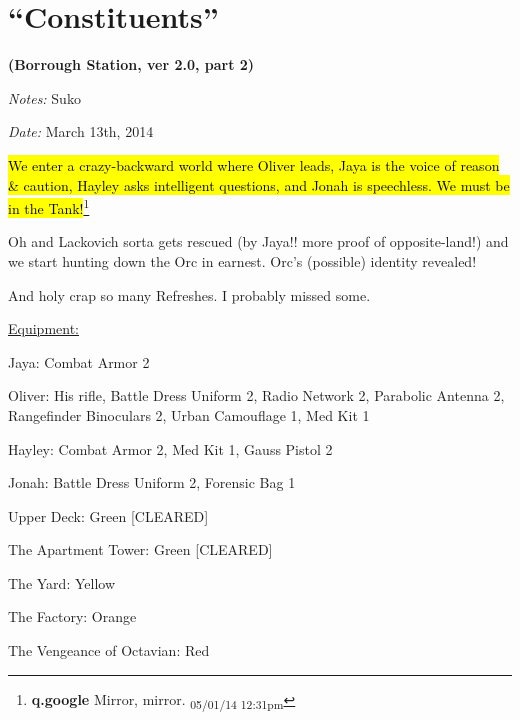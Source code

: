 \setcounter{chapter}{ 21 }
\chapter{\textbf{``Constituents''} }




\begin{center}
 {\LARGE \textbf{(Borrough Station, ver 2.0, part 2)} } 
\end{center}




\textit{Notes:} Suko

\textit{Date:} March 13th, 2014



\hl{We enter a crazy-backward world where Oliver leads, Jaya is the voice of reason \& caution, Hayley asks intelligent questions, and Jonah is speechless.  We must be in the Tank!}\footnote{\textbf{q.google }Mirror, mirror. \textsubscript{05/01/14 12:31pm}}



Oh and Lackovich sorta gets rescued (by Jaya!!  more proof of opposite-land!) and we start hunting down the Orc in earnest.  Orc's (possible) identity revealed!



And holy crap so many Refreshes.  I probably missed some.



\noindent\hrulefill






\underline{ Equipment: }

Jaya: Combat Armor 2

Oliver: His rifle, Battle Dress Uniform 2, Radio Network 2, Parabolic Antenna 2, Rangefinder Binoculars 2, Urban Camouflage 1, Med Kit 1

Hayley: Combat Armor 2, Med Kit 1, Gauss Pistol 2

Jonah: Battle Dress Uniform 2, Forensic Bag 1



Upper Deck: Green {[}CLEARED{]}

The Apartment Tower: Green {[}CLEARED{]}

The Yard: Yellow

The Factory: Orange

The Vengeance of Octavian: Red





